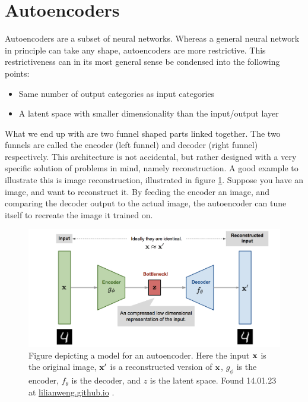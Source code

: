\section{Autoencoders}\label{sec:autoencder_theory}
Autoencoders are a subset of neural networks. Whereas a general neural network
 in principle can take any shape, autoencoders are more restrictive.
This restrictiveness can in its most general sense be condensed 
into the following points:
\begin{itemize}
    \item Same number of output categories as input categories  
    \item A latent space with smaller dimensionality than the input/output layer  
\end{itemize}
What we end up with are two funnel shaped parts linked together. The two funnels are 
called the encoder (left funnel) and decoder (right funnel) respectively. This architecture is not 
accidental, but rather designed with a very specific solution of problems in mind, namely reconstruction. 
A good example to illustrate this is image reconstruction, illustrated in figure \ref{fig:ae_denoise}. 
Suppose you have an image, and want to reconstruct it. By feeding the encoder an image, 
and comparing the decoder output to the actual image, the autoencoder can tune itself to recreate the image it trained on. 

\begin{figure}[H]
    \includegraphics[width=\linewidth]{Figures/Machinelearning/autoencoder_imagedenoising.png}
    \caption[Conceptual autoencoder]{Figure depicting a model for an autoencoder. Here the input $\bf{x}$ is the original image, $\bf{x'}$ is a reconstructed version of $\bf{x}$, $g_{\phi}$ is the encoder, $f_{\theta}$ is the decoder, and $z$ is the latent space. Found 14.01.23 at \href{https://lilianweng.github.io/posts/2018-08-12-vae/autoencoder-architecture.png}{lilianweng.github.io} \cite{weng2018VAE}. }
    \label{fig:ae_denoise}
\end{figure}

